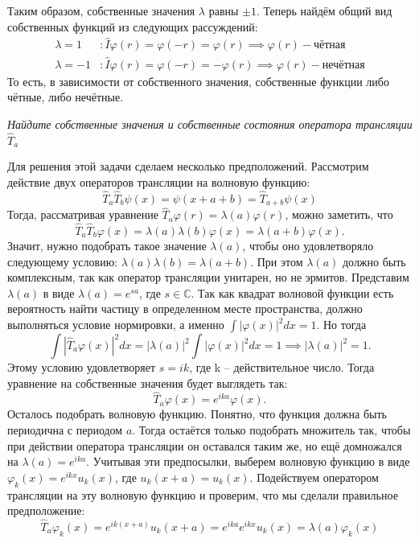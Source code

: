 Таким образом, собственные значения $\lambda$ равны $\pm 1$. Теперь найдём общий вид собственных функций из следующих рассуждений:
\begin{align*}
    \lambda = 1 &: \hat I \varphi(r) = \varphi(-r) = \varphi(r) \implies \varphi(r) - \text{чётная} \\
    \lambda = -1 &: \hat I \varphi(r) = \varphi(-r) = -\varphi(r) \implies \varphi(r) - \text{нечётная}
\end{align*}
То есть, в зависимости от собственного значения, собственные функции либо чётные, либо нечётные.
\begin{center}
\textit{Найдите собственные значения и собственные состояния оператора трансляции $\hat T_a$}
\end{center}
Для решения этой задачи сделаем несколько предположений. Рассмотрим действие двух операторов трансляции на волновую функцию:
\[
\hat{T}_{a}\hat{T}_{b}\psi(x) = \psi(x + a + b) = \hat{T}_{a + b}\psi(x)
\]
Тогда, рассматривая уравнение $\hat T_a \varphi(r) = \lambda(a) \varphi(r)$, можно заметить, что
\[
\hat{T}_{a}\hat{T}_{b}\varphi(x) = \lambda(a)\lambda(b)\varphi(x) = \lambda(a + b) \varphi(x).
\]
Значит, нужно подобрать такое значение $\lambda(a)$, чтобы оно удовлетворяло следующему условию: $\lambda(a)\lambda(b) = \lambda(a + b)$. При этом $\lambda(a)$ должно быть комплексным, так как оператор трансляции унитарен, но не эрмитов. Представим $\lambda(a)$ в виде $\lambda(a) = e^{sa}$, где $s \in \mathbb{C}$.
Так как квадрат волновой функции есть вероятность найти частицу в определенном месте пространства, должно выполняться условие нормировки, а именно $\int |\varphi(x)|^2 dx = 1$. Но тогда 
\[
\int |\hat{T}_a\varphi(x)|^2 dx = |\lambda(a)|^2\int |\varphi(x)|^2 dx = 1 \implies |\lambda(a)|^2 = 1.
\]
Этому условию удовлетворяет $s = ik$, где k -- действительное число. Тогда уравнение на собственные значения будет выглядеть так:
\[
\hat{T}_{a}\varphi(x) = e^{ika}\varphi(x).
\]
Осталось подобрать волновую функцию. Понятно, что функция должна быть периодична с периодом $a$. Тогда остаётся только подобрать множитель так, чтобы при действии оператора трансляции он оставался таким же, но ещё домножался на $\lambda(a) = e^{ika}$. Учитывая эти предпосылки, выберем волновую функцию в виде $\varphi_k(x) = e^{ikx}u_k(x)$, где $u_k(x + a) = u_k(x)$. Подействуем оператором трансляции на эту волновую функцию и проверим, что мы сделали правильное предположение:
\[
\hat T_a \varphi_k(x) = e^{ik(x + a)} u_k(x + a) = e^{ika} e^{ikx} u_k(x) = \lambda(a) \varphi_k(x)
\]
